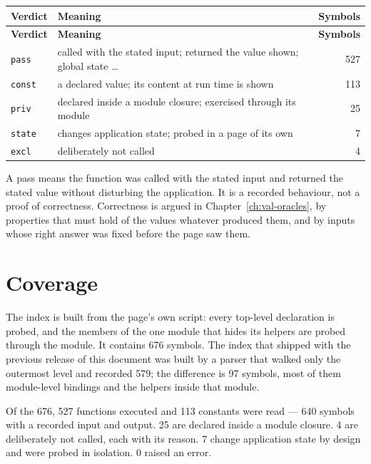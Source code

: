 {\small
\begin{xltabular}{\linewidth}{|X|l|r|}
\toprule \textbf{Verdict} & \textbf{Meaning} & \textbf{Symbols} \\\midrule\endfirsthead
\toprule \textbf{Verdict} & \textbf{Meaning} & \textbf{Symbols} \\\midrule\endhead
\texttt{pass} & called with the stated input; returned the value shown; global state … & 527 \\
\texttt{const} & a declared value; its content at run time is shown & 113 \\
\texttt{priv} & declared inside a module closure; exercised through its module & 25 \\
\texttt{state} & changes application state; probed in a page of its own & 7 \\
\texttt{excl} & deliberately not called & 4 \\
\bottomrule
\end{xltabular}}


\begin{notebox}[title={\textbf{What this part does not claim}}]
A pass means the function was called with the stated input and returned the stated
value without disturbing the application. It is a recorded behaviour, not a proof
of correctness. Correctness is argued in Chapter~\ref{ch:val-oracles}, by
properties that must hold of the values whatever produced them, and by inputs
whose right answer was fixed before the page saw them.
\end{notebox}

\section{Coverage}
The index is built from the page's own script: every top-level declaration is
probed, and the members of the one module that hides its helpers are probed
through the module. It contains 676 symbols. The index that shipped with the
previous release of this document was built by a parser that walked only the
outermost level and recorded 579; the difference is 97 symbols, most of them
module-level bindings and the helpers inside that module.

Of the 676, 527 functions executed and 113 constants were read --- 640 symbols with a
recorded input and output. 25 are declared inside a module closure. 4 are
deliberately not called, each with its reason. 7 change application state by
design and were probed in isolation. 0 raised an error.

